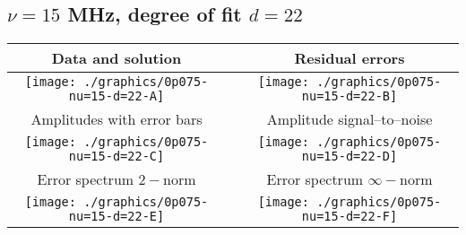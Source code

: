 

% 

\clearpage{}
\break{}

\subsection{$\nu = 15$ MHz, degree of fit $d = 22$}

\begin{table}[h]
    \begin{center}
        \begin{tabular}{ccc}
            Data and solution & \quad & Residual errors \\\hline
            \texttt{[image: ./graphics/0p075-nu=15-d=22-A]} &&
            \texttt{[image: ./graphics/0p075-nu=15-d=22-B]} \\[15pt]
            Amplitudes with error bars && Amplitude signal--to--noise \\\hline
            \texttt{[image: ./graphics/0p075-nu=15-d=22-C]} &&
            \texttt{[image: ./graphics/0p075-nu=15-d=22-D]} \\[15pt]
            Error spectrum $2-$norm && Error spectrum $\infty-$norm \\\hline
            \texttt{[image: ./graphics/0p075-nu=15-d=22-E]} &&
            \texttt{[image: ./graphics/0p075-nu=15-d=22-F]} \\[15pt]
        \end{tabular}
    \end{center}
\label{fig:elev=75, nu=15}
\end{table}



\endinput

